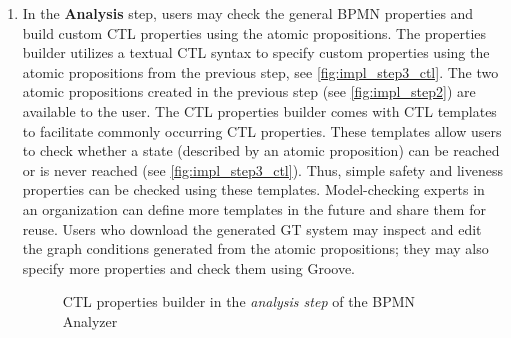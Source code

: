 \documentclass{lmcs} %
\begin{document}
\begin{enumerate}
  \item In the \textbf{Analysis} step, users may check the general BPMN properties and build custom CTL properties using the atomic propositions.
  The properties builder utilizes a textual CTL syntax to specify custom properties using the atomic propositions from the previous step, see \autoref{fig:impl_step3_ctl}.
  The two atomic propositions created in the previous step (see \autoref{fig:impl_step2}) are available to the user.
  The CTL properties builder comes with CTL templates to facilitate commonly occurring CTL properties.
  These templates allow users to check whether a state (described by an atomic proposition) can be reached or is never reached (see \autoref{fig:impl_step3_ctl}).
  Thus, simple safety and liveness properties can be checked using these templates.
  Model-checking experts in an organization can define more templates in the future and share them for reuse.
  Users who download the generated GT system may inspect and edit the graph conditions generated from the atomic propositions; they may also specify more properties and check them using Groove.

  \begin{figure}[ht]
      \centering
      \caption{CTL properties builder in the \textit{analysis step} of the BPMN Analyzer}
      \label{fig:impl_step3_ctl}
  \end{figure}
  
\end{enumerate}
\end{document}
